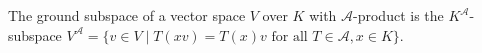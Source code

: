 The ground subspace of a vector space $V$ over $K$ with $\mathcal{A}$-product is the $K^{\mathcal{A}}$-subspace $V^{\mathcal{A}} = \{v \in V \mid T(xv) = T(x)v \text{ for all } T \in \mathcal{A}, x \in K\}$.
